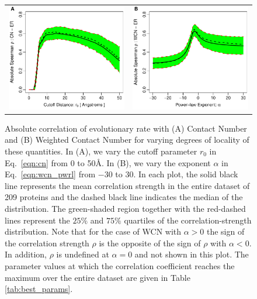 \documentclass[12pt]{article}
\begin{document}
    \begin{figure}
        \begin{center}
        \begin{tabular}{cc}
            \includegraphics[width=3.1in]{spcor_cnSC_r4sJC.pdf} & \includegraphics[width=3.1in]{spcor_cnwSC_r4sJC.pdf}
        \end{tabular}
        \end{center}
        \caption{Absolute correlation of evolutionary rate with (A) Contact Number and (B) Weighted Contact Number for varying degrees of locality of these quantities. In (A), we vary the cutoff parameter $r_0$ in Eq.~\ref{eqn:cn} from 0 to 50\AA. In (B), we vary the exponent $\alpha$ in Eq.~\ref{eqn:wcn_pwrl} from $-30$ to 30. In each plot, the solid black line represents the mean correlation strength in the entire dataset of 209 proteins and the dashed black line indicates the median of the distribution. The green-shaded region together with the red-dashed lines represent the $25\%$ and $75\%$ quartiles of the correlation-strength distribution. Note that for the case of WCN with $\alpha>0$ the sign of the correlation strength $\rho$ is the opposite of the sign of $\rho$ with $\alpha<0$. In addition, $\rho$ is undefined at $\alpha=0$ and not shown in this plot. The parameter values at which the correlation coefficient reaches the maximum over the entire dataset are given in Table \ref{tab:best_params}.}
        \label{fig:cnwcnp}
    \end{figure}
\end{document}
